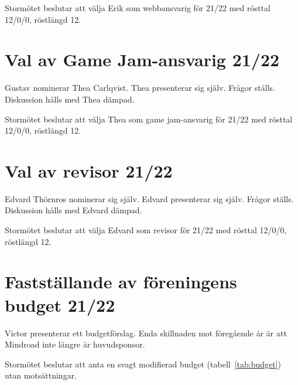 \documentclass[a4paper]{article}
\begin{document}
Stormötet beslutar att välja Erik som webbansvarig för 21/22 med rösttal 12/0/0, röstlängd 12.

\section{Val av Game Jam-ansvarig 21/22}

Gustav nominerar Thea Carlqvist. Thea presenterar sig själv. Frågor ställs. Diskussion
hålls med Thea dämpad.

Stormötet beslutar att välja Thea som game jam-ansvarig för 21/22 med rösttal 12/0/0, röstlängd 12.

\section{Val av revisor 21/22}

Edvard Thörnros nominerar sig själv. Edvard presenterar sig själv. Frågor ställs. Diskussion
hålls med Edvard dämpad.

Stormötet beslutar att välja Edvard som revisor för 21/22 med rösttal 12/0/0, röstlängd 12.

\section{Fastställande av föreningens budget 21/22}

Victor presenterar ett budgetförslag. Enda skillnaden mot föregående år är att
Mindroad inte längre är huvudsponsor.

Stormötet beslutar att anta en svagt modifierad budget (tabell~\ref{tab:budget}) utan motsättningar.
\end{document}
